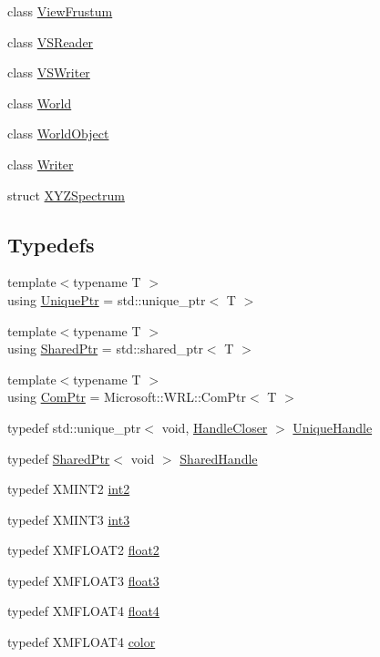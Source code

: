 \begin{DoxyCompactItemize}
\item 
class \hyperlink{classmage_1_1_view_frustum}{View\+Frustum}
\item 
class \hyperlink{classmage_1_1_v_s_reader}{V\+S\+Reader}
\item 
class \hyperlink{classmage_1_1_v_s_writer}{V\+S\+Writer}
\item 
class \hyperlink{classmage_1_1_world}{World}
\item 
class \hyperlink{classmage_1_1_world_object}{World\+Object}
\item 
class \hyperlink{classmage_1_1_writer}{Writer}
\item 
struct \hyperlink{structmage_1_1_x_y_z_spectrum}{X\+Y\+Z\+Spectrum}
\end{DoxyCompactItemize}
\subsection*{Typedefs}
\begin{DoxyCompactItemize}
\item 
{\footnotesize template$<$typename T $>$ }\\using \hyperlink{namespacemage_a8c307fbcc33bce9b7f2aa4c26c3b95cf}{Unique\+Ptr} = std\+::unique\+\_\+ptr$<$ T $>$
\item 
{\footnotesize template$<$typename T $>$ }\\using \hyperlink{namespacemage_a1e01ae66713838a7a67d30e44c67703e}{Shared\+Ptr} = std\+::shared\+\_\+ptr$<$ T $>$
\item 
{\footnotesize template$<$typename T $>$ }\\using \hyperlink{namespacemage_ae74f374780900893caa5555d1031fd79}{Com\+Ptr} = Microsoft\+::\+W\+R\+L\+::\+Com\+Ptr$<$ T $>$
\item 
typedef std\+::unique\+\_\+ptr$<$ void, \hyperlink{structmage_1_1_handle_closer}{Handle\+Closer} $>$ \hyperlink{namespacemage_a284e84e551a05d4fc6c957985b2de3ed}{Unique\+Handle}
\item 
typedef \hyperlink{namespacemage_a1e01ae66713838a7a67d30e44c67703e}{Shared\+Ptr}$<$ void $>$ \hyperlink{namespacemage_ab892828913d6129acf71e0cec60467e5}{Shared\+Handle}
\item 
typedef X\+M\+I\+N\+T2 \hyperlink{namespacemage_aa22600b49377872988582e782d7b1fcd}{int2}
\item 
typedef X\+M\+I\+N\+T3 \hyperlink{namespacemage_a80c7f9de83dfbbd55bbf339dbcbd99cc}{int3}
\item 
typedef X\+M\+F\+L\+O\+A\+T2 \hyperlink{namespacemage_a536f5856288c280080c9cdf739e85ddc}{float2}
\item 
typedef X\+M\+F\+L\+O\+A\+T3 \hyperlink{namespacemage_aab5dae4b0aaf8129b9e0d651d91d4b38}{float3}
\item 
typedef X\+M\+F\+L\+O\+A\+T4 \hyperlink{namespacemage_aa79484ea5211c29727b3794199ac0a55}{float4}
\item 
typedef X\+M\+F\+L\+O\+A\+T4 \hyperlink{namespacemage_a56eceea5a9bceb2b56073f3ea4945781}{color}
\end{DoxyCompactItemize}
